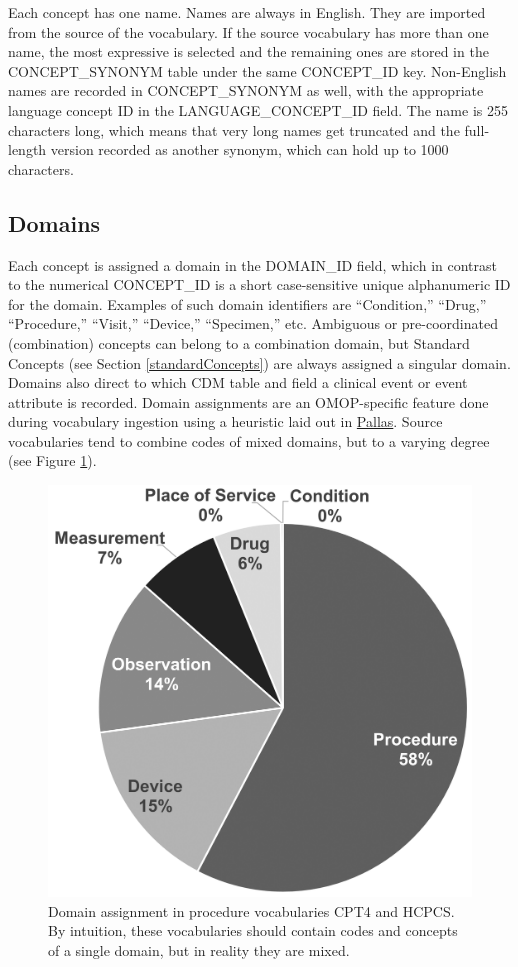 \documentclass[11pt]{book}
\theoremstyle{definition}
\theoremstyle{definition}
\theoremstyle{definition}
\theoremstyle{remark}
\begin{document}
Each concept has one name. Names are always in English. They are
imported from the source of the vocabulary. If the source vocabulary has
more than one name, the most expressive is selected and the remaining
ones are stored in the CONCEPT\_SYNONYM table under the same CONCEPT\_ID
key. Non-English names are recorded in CONCEPT\_SYNONYM as well, with
the appropriate language concept ID in the LANGUAGE\_CONCEPT\_ID field.
The name is 255 characters long, which means that very long names get
truncated and the full-length version recorded as another synonym, which
can hold up to 1000 characters.

\subsection{Domains}\label{conceptDomains}

Each concept is assigned a domain in the DOMAIN\_ID field, which in
contrast to the numerical CONCEPT\_ID is a short case-sensitive unique
alphanumeric ID for the domain. Examples of such domain identifiers are
``Condition,'' ``Drug,'' ``Procedure,'' ``Visit,'' ``Device,''
``Specimen,'' etc. Ambiguous or pre-coordinated (combination) concepts
can belong to a combination domain, but Standard Concepts (see Section
\ref{standardConcepts}) are always assigned a singular domain. Domains
also direct to which CDM table and field a clinical event or event
attribute is recorded. Domain assignments are an OMOP-specific feature
done during vocabulary ingestion using a heuristic laid out in
\href{https://github.com/ohDSI/vocabulary-v5.0}{Pallas}. Source
vocabularies tend to combine codes of mixed domains, but to a varying
degree (see Figure \ref{fig:domains}). 

\begin{figure}

{\centering \includegraphics[width=0.7\linewidth]{images/StandardizedVocabularies/domains} 

}

\caption{Domain assignment in procedure vocabularies CPT4 and HCPCS. By intuition, these vocabularies should contain codes and concepts of a single domain, but in reality they are mixed.}\label{fig:domains}
\end{figure}
\end{document}
